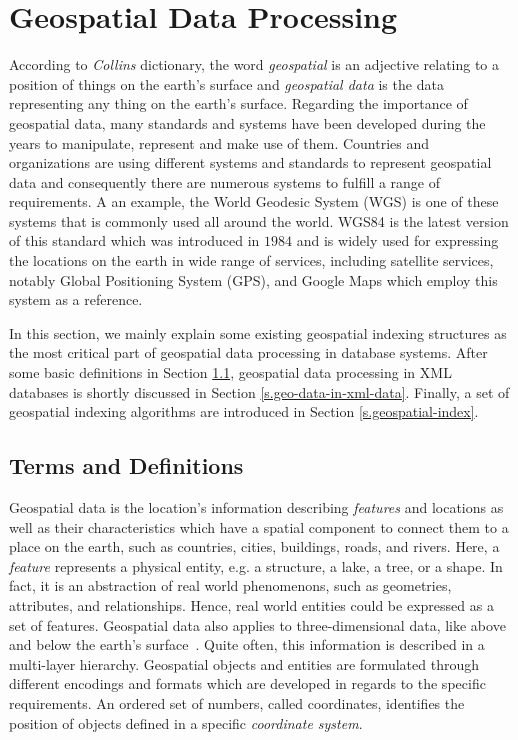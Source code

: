 \documentclass[a4paper,12pt]{article}
\begin{document}
\newpage
\section{Geospatial Data Processing}
\label{s.method}
According to \emph{Collins} dictionary, the word \emph{geospatial} is an adjective relating to a position of things on the earth's surface and \emph{geospatial data} is the data representing any thing on the earth's surface. Regarding the importance of geospatial data, many standards and systems have been developed  during the years to manipulate, represent and make use of them. Countries and organizations are using different systems and standards to represent geospatial data and consequently there are numerous systems to fulfill a range of requirements. A an example, the World Geodesic System (WGS) is one of these systems that is commonly used all around the world. WGS84 is the latest version of this standard which
was introduced in $1984$ and is widely used for expressing the locations on the earth in wide range of services, including satellite services, notably Global Positioning System (GPS), and Google Maps which employ this system as a reference.

In this section, we mainly explain some existing geospatial indexing structures as the most critical part of geospatial data processing in database systems. After some basic definitions in Section \ref{termsanddef}, geospatial data processing in XML~\cite{www/xml} databases is shortly discussed in Section \ref{s.geo-data-in-xml-data}.
Finally, a set of geospatial indexing algorithms are introduced in Section \ref{s.geospatial-index}.

\subsection{Terms and Definitions}
\label{termsanddef}
Geospatial data is the location's information describing \textit{features} and locations as well as their characteristics which have a spatial component to connect them to a place on the earth, such as countries, cities, buildings, roads, and rivers. Here, a \textit{feature} represents a physical entity, e.g. a structure, a lake, a tree, or a shape. In fact, it is an abstraction of real world phenomenons, such as geometries, attributes, and relationships. Hence, real world entities could be expressed as a set of features.
Geospatial data also applies to three-dimensional data, like above and below the earth's surface~\cite{powell}. Quite often, this information is described in a multi-layer hierarchy. Geospatial objects and entities are formulated through different encodings and formats which are developed in regards to the specific requirements. An ordered set of numbers, called coordinates, identifies the position of objects  defined in a specific \textit{coordinate system}. 
\end{document}
